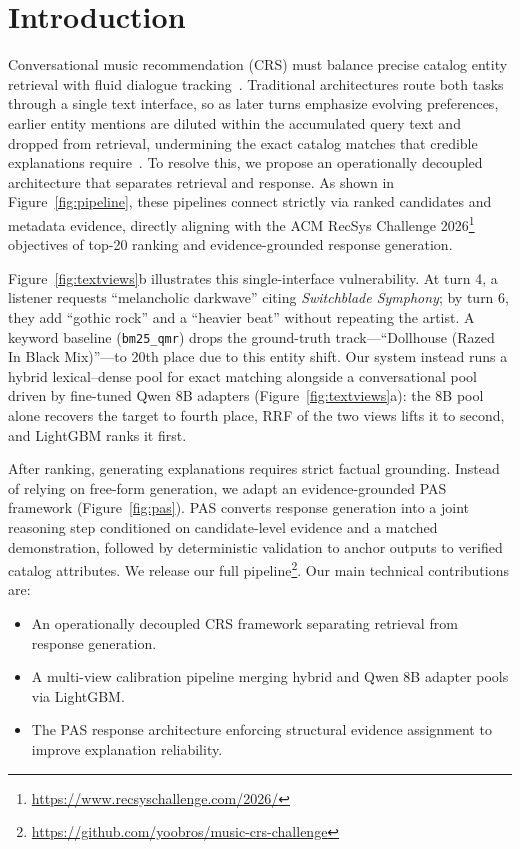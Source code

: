 \documentclass[sigconf]{acmart}
\begin{document}
\section{Introduction}

Conversational music recommendation (CRS) must balance precise catalog entity retrieval with fluid dialogue tracking~\cite{melchiorre2025jam,kemper2024rarec}. Traditional architectures route both tasks through a single text interface, so as later turns emphasize evolving preferences, earlier entity mentions are diluted within the accumulated query text and dropped from retrieval, undermining the exact catalog matches that credible explanations require~\cite{qin2024credible}. To resolve this, we propose an operationally decoupled architecture that separates retrieval and response. As shown in Figure~\ref{fig:pipeline}, these pipelines connect strictly via ranked candidates and metadata evidence, directly aligning with the ACM RecSys Challenge 2026\footnote{\url{https://www.recsyschallenge.com/2026/}} objectives of top-20 ranking and evidence-grounded response generation.

Figure~\ref{fig:textviews}b illustrates this single-interface vulnerability. At turn 4, a listener requests ``melancholic darkwave'' citing \textit{Switchblade Symphony}; by turn 6, they add ``gothic rock'' and a ``heavier beat'' without repeating the artist. A keyword baseline (\texttt{bm25\_qmr}) drops the ground-truth track---``Dollhouse (Razed In Black Mix)''---to 20th place due to this entity shift. Our system instead runs a hybrid lexical--dense pool for exact matching alongside a conversational pool driven by fine-tuned Qwen 8B adapters (Figure~\ref{fig:textviews}a): the 8B pool alone recovers the target to fourth place, RRF of the two views lifts it to second, and LightGBM ranks it first.

After ranking, generating explanations requires strict factual grounding. Instead of relying on free-form generation, we adapt an evidence-grounded PAS framework (Figure~\ref{fig:pas}). PAS converts response generation into a joint reasoning step conditioned on candidate-level evidence and a matched demonstration, followed by deterministic validation to anchor outputs to verified catalog attributes. We release our full pipeline\footnote{\url{https://github.com/yoobros/music-crs-challenge}}. Our main technical contributions are:
\begin{itemize}
    \item An operationally decoupled CRS framework separating retrieval from response generation.
    \item A multi-view calibration pipeline merging hybrid and Qwen 8B adapter pools via LightGBM.
    \item The PAS response architecture enforcing structural evidence assignment to improve explanation reliability.
\end{itemize}
\end{document}
